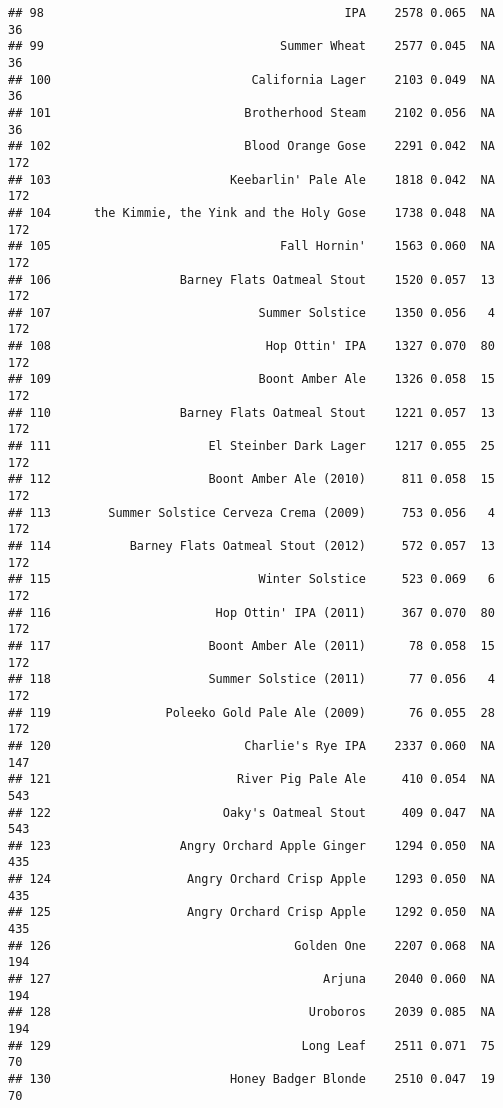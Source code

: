 \documentclass[
]{article}
\begin{document}
\begin{verbatim}
## 98                                          IPA    2578 0.065  NA         36
## 99                                 Summer Wheat    2577 0.045  NA         36
## 100                            California Lager    2103 0.049  NA         36
## 101                           Brotherhood Steam    2102 0.056  NA         36
## 102                           Blood Orange Gose    2291 0.042  NA        172
## 103                         Keebarlin' Pale Ale    1818 0.042  NA        172
## 104      the Kimmie, the Yink and the Holy Gose    1738 0.048  NA        172
## 105                                Fall Hornin'    1563 0.060  NA        172
## 106                  Barney Flats Oatmeal Stout    1520 0.057  13        172
## 107                             Summer Solstice    1350 0.056   4        172
## 108                              Hop Ottin' IPA    1327 0.070  80        172
## 109                             Boont Amber Ale    1326 0.058  15        172
## 110                  Barney Flats Oatmeal Stout    1221 0.057  13        172
## 111                      El Steinber Dark Lager    1217 0.055  25        172
## 112                      Boont Amber Ale (2010)     811 0.058  15        172
## 113        Summer Solstice Cerveza Crema (2009)     753 0.056   4        172
## 114           Barney Flats Oatmeal Stout (2012)     572 0.057  13        172
## 115                             Winter Solstice     523 0.069   6        172
## 116                       Hop Ottin' IPA (2011)     367 0.070  80        172
## 117                      Boont Amber Ale (2011)      78 0.058  15        172
## 118                      Summer Solstice (2011)      77 0.056   4        172
## 119                Poleeko Gold Pale Ale (2009)      76 0.055  28        172
## 120                           Charlie's Rye IPA    2337 0.060  NA        147
## 121                          River Pig Pale Ale     410 0.054  NA        543
## 122                        Oaky's Oatmeal Stout     409 0.047  NA        543
## 123                  Angry Orchard Apple Ginger    1294 0.050  NA        435
## 124                   Angry Orchard Crisp Apple    1293 0.050  NA        435
## 125                   Angry Orchard Crisp Apple    1292 0.050  NA        435
## 126                                  Golden One    2207 0.068  NA        194
## 127                                      Arjuna    2040 0.060  NA        194
## 128                                    Uroboros    2039 0.085  NA        194
## 129                                   Long Leaf    2511 0.071  75         70
## 130                         Honey Badger Blonde    2510 0.047  19         70

\end{verbatim}
\end{document}
